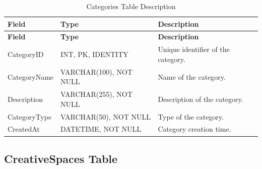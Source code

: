 \begin{longtable}{
		|>{\raggedright\arraybackslash}p{3.2cm}|
		>{\raggedright\arraybackslash}p{4.2cm}|
		>{\raggedright\arraybackslash}p{5.0cm}|
	}
	\caption{Categories Table Description}
	\label{tab:categories}\\
	\hline
	\textbf{Field} & \textbf{Type} & \textbf{Description} \\ \hline
	\endfirsthead
	\hline
	\textbf{Field} & \textbf{Type} & \textbf{Description} \\ \hline
	\endhead
	
	CategoryID & INT, PK, IDENTITY &
	Unique identifier of the category. \\ \hline
	
	CategoryName & VARCHAR(100), NOT NULL &
	Name of the category. \\ \hline
	
	Description & VARCHAR(255), NOT NULL &
	Description of the category. \\ \hline
	
	CategoryType & VARCHAR(50), NOT NULL &
	Type of the category. \\ \hline
	
	CreatedAt & DATETIME, NOT NULL &
	Category creation time. \\ \hline
	
\end{longtable}


\subsection{CreativeSpaces Table}

